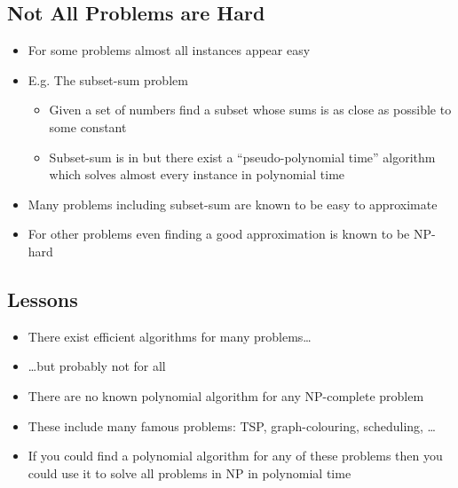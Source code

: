 
\begin{slide}
\section[-1]{Not All  Problems are Hard}

\begin{PauseHighLight}
  \begin{itemize}
  \item For some problems almost all instances appear easy\pause
  \item E.g. The subset-sum problem\pause
    \begin{itemize}
    \item Given a set of numbers find a subset whose sums is as close as
      possible to some constant\pause
    \item Subset-sum is in  but there exist a
      ``pseudo-polynomial time'' algorithm which solves almost every
      instance in polynomial time\pause
    \end{itemize}
  \item Many problems including subset-sum are known to be easy to
    approximate\pause
  \item For other problems even finding a good approximation is known to
    be NP-hard\pause
  \end{itemize}
\end{PauseHighLight}

\end{slide}



\begin{slide}
\section{Lessons}

\begin{PauseHighLight}
  \begin{itemize}
  \item There exist efficient algorithms for many problems\ldots\pause
  \item \ldots but probably not for all\pause
  \item There are no known polynomial algorithm for any NP-complete
    problem\pause
  \item These include many famous problems: TSP, graph-colouring,
    scheduling, \ldots\pause
  \item If you could find a polynomial algorithm for any of these
    problems then you could use it to solve all problems in NP in
    polynomial time\pause
  \end{itemize}
\end{PauseHighLight}

\end{slide}

